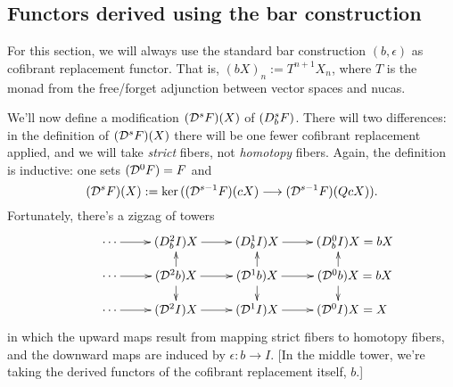 \documentclass[10pt]{article}
\begin{document}
\begin{convergence}

\subsection{Functors derived using the bar construction}
For this section, we will always use the standard bar construction $(b,\epsilon)$ as cofibrant replacement functor. That is, $(bX)_n:=T^{n+1}X_n$, where $T$ is the monad from the free/forget adjunction between vector spaces and nucas.

We'll now define a modification $(\mathcal{D}^{\smash{s}}F)(X)$ of $(D^{\smash{s}}_{\smash{b}}F)$. There will two differences: in the definition of $(\mathcal{D}^{\smash{s}}F)(X)$ there will be one fewer cofibrant replacement applied, and we will take \emph{strict} fibers, not \emph{homotopy} fibers. Again, the definition is inductive: one sets $(\mathcal{D}^{\smash{0}}F)=F$ and
\[(\mathcal{D}^{\smash{s}}F)(X):=\textup{ker}\,((\mathcal{D}^{\smash{s-1}}F)(cX)\longrightarrow (\mathcal{D}^{\smash{s-1}}F)(QcX)).\]
Fortunately, there's a zigzag of towers
\[\xymatrix@R=4mm{
\cdots 
\ar[r]
&%
(\dupdown{2}{b}I)X
\ar[r]
&%
(\dupdown{1}{b}I)X
\ar[r]&%
(\dupdown{0}{b}I)X\makebox[0pt][l]{$\mbox{}=bX$}\\
\cdots 
\ar[r]
&%
(\caldup{2}b)X
\ar[u]_-{}
\ar[d]^-{}
\ar[r]
&%
(\caldup{1}b)X
\ar[u]_-{}
\ar[d]^-{}
\ar[r]&%
(\caldup{0}b)X\makebox[0pt][l]{$\mbox{}=bX$}
\ar[u]_-{}
\ar[d]^-{}\\
\cdots 
\ar[r]
&%
(\caldup{2}I)X
\ar[r]
&%
(\caldup{1}I)X
\ar[r]&%
(\caldup{0}I)X\makebox[0pt][l]{$\mbox{}=X$}
}\]
in which the upward maps result from mapping strict fibers to homotopy fibers, and the downward maps are induced by $\epsilon:b\to I$. [In the middle tower, we're taking the derived functors of the cofibrant replacement itself, $b$.]
%


\end{convergence}
\end{document}
